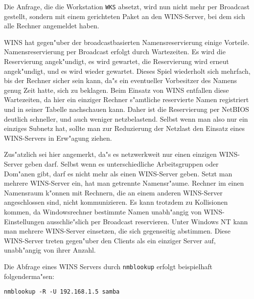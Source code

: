 \documentclass{scrartcl}
\newcommand{\prog}{\texttt}
\newcommand{\nbname}{\texttt}
\begin{document}
Die Anfrage, die die Workstation \nbname{WKS} absetzt, wird nun nicht
mehr per Broadcast gestellt, sondern mit einem gerichteten Paket an
den WINS-Server, bei dem sich alle Rechner angemeldet haben.


WINS hat gegen"uber der broadcastbasierten Namensreservierung einige
Vorteile. Namensreservierung per Broadcast erfolgt durch Wartezeiten.
Es wird die Reservierung angek"undigt, es wird gewartet, die
Reservierung wird erneut angek"undigt, und es wird wieder gewartet.
Dieses Spiel wiederholt sich mehrfach, bis der Rechner sicher sein
kann, da"s ein eventueller Vorbesitzer des Namens genug Zeit hatte,
sich zu beklagen. Beim Einsatz von WINS entfallen diese Wartezeiten,
da hier ein einziger Rechner s"amtliche reservierte Namen registriert
und in seiner Tabelle nachschauen kann. Daher ist die Reservierung per
NetBIOS deutlich schneller, und auch weniger netzbelastend. Selbst
wenn man also nur ein einziges Subnetz hat, sollte man zur Reduzierung
der Netzlast den Einsatz eines WINS-Servers in Erw"agung ziehen.

Zus"atzlich sei hier angemerkt, da"s es netzwerkweit nur einen
einzigen WINS-Server geben darf. Selbst wenn es unterschiedliche
Arbeitsgruppen oder Dom"anen gibt, darf es nicht mehr als einen
WINS-Server geben. Setzt man mehrere WINS-Server ein, hat man getrennte
Namensr"aume.  Rechner im einen Namensraum k"onnen mit Rechnern, die
an einem anderen WINS-Server angeschlossen sind, nicht kommunizieren.
Es kann trotzdem zu Kollisionen kommen, da Windowsrechner bestimmte
Namen unabh"angig von WINS-Einstellungen ausschlie"slich per Broadcast
reservieren. Unter Windows NT kann man mehrere WINS-Server einsetzen,
die sich gegenseitig abstimmen. Diese WINS-Server treten gegen"uber
den Clients als ein einziger Server auf, unabh"angig von ihrer Anzahl.

Die Abfrage eines WINS Servers durch \prog{nmblookup} erfolgt
beispielhaft folgenderma"sen:

\begin{verbatim}
nmblookup -R -U 192.168.1.5 samba
\end{verbatim}
\end{document}
